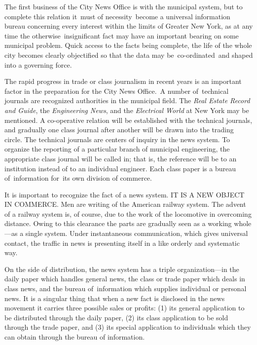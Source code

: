 \documentclass[openany,nobib]{tufte-book}
\begin{document}
The first business of the City News Office is with the municipal system,
but to complete this relation it~must of necessity~become a universal
information bureau concerning every interest within the limits of
Greater New York, as at any time the otherwise~insignificant fact may
have an important bearing on some municipal problem. Quick access to the
facts being complete, the life of the whole city becomes clearly
objectified so that the data may be~co-ordinated~and shaped into a
governing force.~

The rapid progress in trade or class journalism in recent years is an
important factor in the preparation for the City News Office.~A number
of~technical journals are recognized authorities in the municipal field.
The\emph{ Real Estate Record and Guide}, the \emph{Engineering News},
and the \emph{Electrical World} at New York may be mentioned. A
co-operative relation will be established with the technical journals,
and gradually one class journal after another will be drawn into the
trading circle. The technical journals are centers of inquiry in the
news system. To organize the reporting of a particular branch of
municipal engineering, the appropriate class journal will be called in;
that is, the reference will be to an institution instead of to an
individual engineer. Each class paper is a bureau of~information for~its
own division of commerce.~

It is important to recognize the fact of a news system. IT IS A NEW
OBJECT IN COMMERCE. Men are writing of the American railway system. The
advent of a railway system is, of course, due to the work of the
locomotive in overcoming distance. Owing to this clearance the parts are
gradually seen as a working whole---as a single system. Under
instantaneous communication, which gives universal contact, the traffic
in news is presenting itself in a like orderly and systematic way.~~

On the side of distribution, the news system has a triple
organization---in the daily paper which handles general news, the class
or trade paper which deals in class news, and the bureau of~information
which supplies individual or personal news. It is a singular thing that
when a new fact is disclosed in the news movement it carries three
possible sales or profits: (1) its general application to be distributed
through the daily paper, (2) its class application to be sold through
the trade paper, and (3) its special application to individuals which
they can obtain through the bureau of information.~
\end{document}
